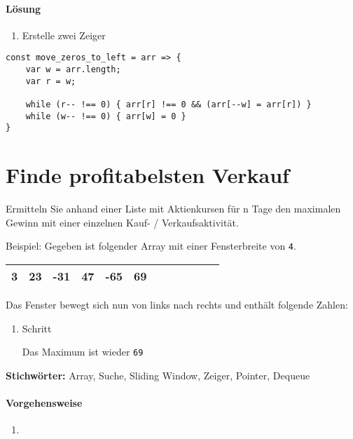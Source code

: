 \documentclass[babel]{book}
\begin{document}
\paragraph{Lösung}
\begin{enumerate} 
	\item Erstelle zwei Zeiger
	
\end{enumerate}

\begin{lstlisting}[caption=My Javascript Example]
const move_zeros_to_left = arr => {
	var w = arr.length; 
	var r = w;

	while (r-- !== 0) { arr[r] !== 0 && (arr[--w] = arr[r]) }
	while (w-- !== 0) { arr[w] = 0 }
}
\end{lstlisting}

\section{Finde profitabelsten Verkauf}
\begin{examplei}
Ermitteln Sie anhand einer Liste mit Aktienkursen für n Tage den maximalen Gewinn mit einer einzelnen Kauf- / Verkaufsaktivität.
	
	Beispiel:
	Gegeben ist folgender Array mit einer Fensterbreite von \lstinline|4|. 	
	
	\begin{tabular}{|l|l|l|l|l|l|l|l|l|l|l|l|} 
		\hline
		3 & 23 & -31 & 47 & -65 & 69 \\
		\hline
	\end{tabular}
	Das Fenster bewegt sich nun von links nach rechts und enthält folgende Zahlen:
	\begin{enumerate}
		\item Schritt	
		
		Das Maximum ist wieder \lstinline|69|
	\end{enumerate}
	
\end{examplei}
{\bf Stichwörter:} Array, Suche, Sliding Window, Zeiger, Pointer, Dequeue

\paragraph{Vorgehensweise}
\begin{enumerate} 
	\item 
\end{enumerate}

\begin{lstlisting}[caption=My Javascript Example]

\end{lstlisting}
\end{document}
